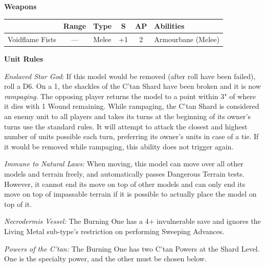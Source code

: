 \begin{minipage}[t]{0.72\textwidth}
	\vspace*{2em}
	\textbf{Weapons}
	
	\begin{tabular}{L{90 pt} c C{40pt} *{2}{c} >{\raggedright\arraybackslash}p{130pt}}
		& Range & Type & S & AP & Abilities \\
		\hline
		Voidflame Fists & — & Melee & +1 & 2 & Armourbane (Melee) \\
	\end{tabular}
	
	\vspace*{2em}
	\textbf{Unit Rules}
	
	\textit{Enslaved Star God}: If this model would be removed (after  roll have been failed), roll a D6. On a 1, the shackles of the C'tan Shard have been broken and it is now \textit{rampaging}. The opposing player returns the model to a point within 3" of where it dies with 1 Wound remaining. While rampaging, the C'tan Shard is considered an enemy unit to all players and takes its turns at the beginning of its owner's turns use the standard rules. It will attempt to attack the closest and highest number of units possible each turn, preferring its owner's units in case of a tie. If it would be removed while rampaging, this ability does not trigger again.
		
	\textit{Immune to Natural Laws:} When moving, this model can move over all other models and terrain freely, and automatically passes Dangerous Terrain tests. However, it cannot end its move on top of other models and can only end its move on top of impassable terrain if it is possible to actually place the model on top of it.
	
	\textit{Necrodermis Vessel:} The Burning One has a 4+ invulnerable save and ignores the Living Metal sub-type's restriction on performing Sweeping Advances.
	
	\textit{Powers of the C'tan:} The Burning One has two C'tan Powers at the Shard Level. One is the  specialty power, and the other must be chosen below.
	

\end{minipage}
